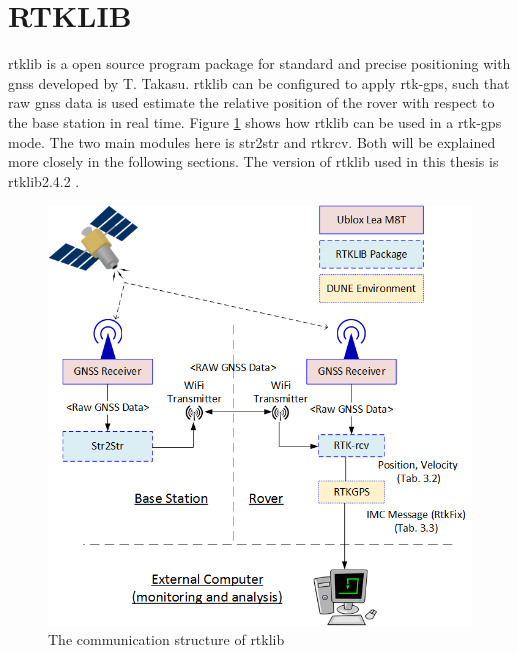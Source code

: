 \section{RTKLIB}\label{ss:Rtklib}
\acrfull{rtklib}\citep{takasu2009development} is a open source program package for standard and precise positioning with \gls{gnss} developed by T. Takasu. \gls{rtklib} can be configured to apply \gls{rtk-gps}, such that raw \gls{gnss} data is used estimate the relative position of the rover with respect to the base station in real time. Figure \ref{figure:RTKLIB_STRUCTURE} shows how \gls{rtklib} can be used in a \gls{rtk-gps} mode. The two main modules here is str2str and rtkrcv. Both will be explained more closely in the following sections. The version of \gls{rtklib} used in this thesis is \gls{rtklib}2.4.2 \citep{Rtklib242}.
\begin{figure}[H]
	\centering
		\includegraphics[width=1\textwidth]{figs/RTKLIB.png}
		\caption{The communication structure of \gls{rtklib}}
		\label{figure:RTKLIB_STRUCTURE}
\end{figure}
